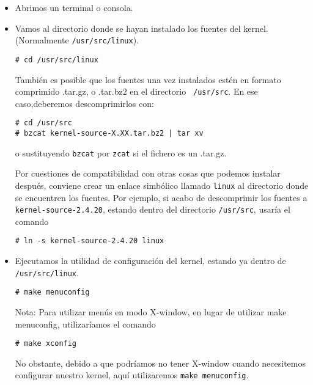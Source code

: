 \begin{itemize}

\item Abrimos un terminal o consola.
\item Vamos al directorio donde se hayan instalado los fuentes del kernel. (Normalmente {\tt /usr/src/linux}).

\begin{verbatim}
# cd /usr/src/linux
\end{verbatim}

También  es posible  que  los  fuentes una  vez  instalados estén  en 
formato  comprimido  .tar.gz,  o   .tar.bz2  en  el  directorio  {\tt 
/usr/src}. En ese caso,deberemos descomprimirlos con:                 

\begin{verbatim}
# cd /usr/src
# bzcat kernel-source-X.XX.tar.bz2 | tar xv
\end{verbatim}

o sustituyendo {\tt bzcat} por {\tt zcat} si el fichero es un .tar.gz.

Por cuestiones de compatibilidad con otras cosas que podemos instalar 
después, conviene  crear un enlace  simbólico llamado {\tt  linux} al 
directorio donde se encuentren los  fuentes. Por ejemplo, si acabo de 
descomprimir los fuentes a {\tt kernel-source-2.4.20}, estando dentro 
del directorio {\tt /usr/src}, usaría el comando                      

\begin{verbatim}
# ln -s kernel-source-2.4.20 linux
\end{verbatim}

\item Ejecutamos la  utilidad de configuración del  kernel, estando ya
dentro de {\tt /usr/src/linux}.

\begin{verbatim}
# make menuconfig
\end{verbatim}

Nota: Para utilizar menús en modo  X-window, en lugar de utilizar make
menuconfig, utilizaríamos el comando

\begin{verbatim}
# make xconfig
\end{verbatim}

No  obstante,  debido  a  que  podríamos  no  tener  X-window  cuando 
necesitemos configurar  nuestro kernel,  aquí utilizaremos  {\tt make 
menuconfig}.                                                          


\end{itemize}
